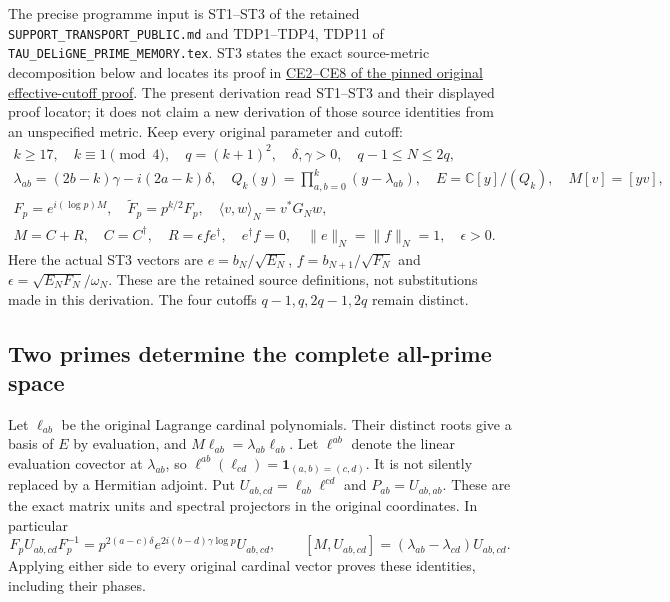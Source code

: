 The precise programme input is ST1--ST3 of the retained
\nolinkurl{SUPPORT_TRANSPORT_PUBLIC.md} and TDP1--TDP4, TDP11
of \nolinkurl{TAU_DELiGNE_PRIME_MEMORY.tex}.
ST3 states the exact source-metric decomposition below and
locates its proof in
\href{https://github.com/KokunoYumeto/zeta-function-research-reader/blob/5c69161ca70ee187f41df0bfe786e8b6eebed422/workbenches/splitzero-tandem/continuations/20260922-current-effective-cutoff/EVOLUTION_PROOF.md#L18}{CE2--CE8
of the pinned original effective-cutoff proof}.
The present derivation read ST1--ST3 and their displayed proof
locator; it does not claim a new derivation of those source
identities from an unspecified metric.
Keep every original parameter and cutoff:
\[
\begin{gathered}
k\ge17,\quad k\equiv1\pmod4,\quad q=(k+1)^2,
\quad\delta,\gamma>0,\quad q-1\le N\le2q,\\
\lambda_{ab}=(2b-k)\gamma-i(2a-k)\delta,\quad
Q_k(y)=\prod_{a,b=0}^k(y-\lambda_{ab}),\quad
E=\mathbb C[y]/(Q_k),\quad M[v]=[yv],\\
F_p=e^{i(\log p)M},\quad\widetilde F_p=p^{k/2}F_p,
\quad \langle v,w\rangle_N=v^*G_Nw,\\
M=C+R,\quad C=C^\dagger,\quad R=\epsilon fe^\dagger,
\quad e^\dagger f=0,\quad\|e\|_N=\|f\|_N=1,\quad\epsilon>0.
\end{gathered}
\tag{MRR1}
\]
Here the actual ST3 vectors are
$e=b_N/\sqrt{E_N}$, $f=b_{N+1}/\sqrt{F_N}$ and
$\epsilon=\sqrt{E_NF_N}/\omega_N$. These are the retained
source definitions, not substitutions made in this derivation.
The four cutoffs $q-1,q,2q-1,2q$ remain distinct.

\subsection{Two primes determine the complete all-prime space}

Let $\ell_{ab}$ be the original Lagrange cardinal polynomials.
Their distinct roots give a basis of $E$ by evaluation, and
$M\ell_{ab}=\lambda_{ab}\ell_{ab}$.
Let $\ell^{ab}$ denote the linear evaluation covector at
$\lambda_{ab}$, so $\ell^{ab}(\ell_{cd})=
\mathbf1_{(a,b)=(c,d)}$. It is not silently replaced by a
Hermitian adjoint. Put
$U_{ab,cd}=\ell_{ab}\ell^{cd}$ and
$P_{ab}=U_{ab,ab}$.
These are the exact matrix units and spectral projectors in
the original coordinates. In particular
\[
F_pU_{ab,cd}F_p^{-1}
=p^{2(a-c)\delta}
 e^{2i(b-d)\gamma\log p}U_{ab,cd},\qquad
[M,U_{ab,cd}]=(\lambda_{ab}-\lambda_{cd})U_{ab,cd}.
\tag{MRR2}
\]
Applying either side to every original cardinal vector proves
these identities, including their phases.


